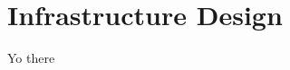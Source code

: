 \thispagestyle{plain}
\newpage
\section{Infrastructure Design}\label{sec:infrastructure-design}

\normalsize

Yo there
